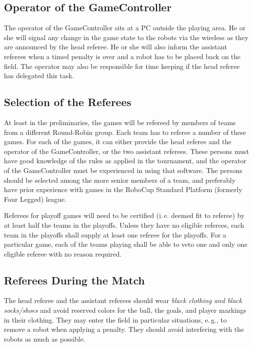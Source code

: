 \documentclass[12pt]{article}
\newcommand{\ie}{\mbox{i.\,e.}\xspace}
\newcommand{\eg}{\mbox{e.\,g.}\xspace}
\begin{document}
\subsection{Operator of the GameController}

The operator of the GameController sits at a PC outside the playing area. He or she will signal any change in the game state to the robots via the wireless as they are announced by the head referee. He or she will also inform the assistant referees when a timed penalty is over and a robot has to be placed back on the field. The operator may also be responsible for time keeping if the head referee has delegated this task.

\subsection{Selection of the Referees}

At least in the preliminaries, the games will be refereed by members of teams from a different Round-Robin group. Each team has to referee a number of these games. For each of the games, it can either provide the head referee and the operator of the GameController, or the two assistant referees. These persons must have good knowledge of the rules as applied in the tournament, and the operator of the GameController must be experienced in using that software. The persons should be selected among the more senior members of a team, and preferably have prior experience with games in the RoboCup Standard Platform (formerly Four Legged) league.

Referees for playoff games will need to be certified (\ie deemed fit to referee) by at least half the teams in the playoffs. Unless they have no eligible referees, each team in the playoffs shall supply at least one referee for the playoffs. For a particular game, each of the teams playing shall be able to veto one and only one eligible referee with no reason required.

\subsection{Referees During the Match}

The head referee and the assistant referees should wear \emph{black clothing and black socks/shoes} and avoid reserved colors for the ball, the goals, and player markings in their clothing. They may enter the field in particular situations, \eg, to remove a robot when applying a penalty. They should avoid interfering with the robots as much as possible.
\end{document}
